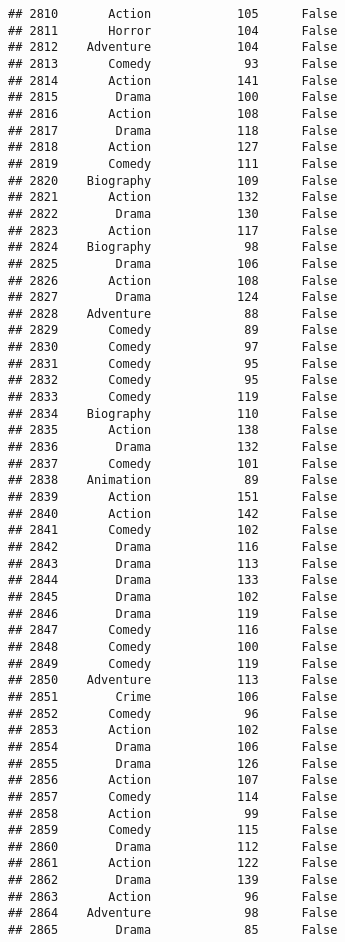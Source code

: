 \documentclass[
]{article}
\begin{document}
\begin{verbatim}
## 2810       Action            105      False
## 2811       Horror            104      False
## 2812    Adventure            104      False
## 2813       Comedy             93      False
## 2814       Action            141      False
## 2815        Drama            100      False
## 2816       Action            108      False
## 2817        Drama            118      False
## 2818       Action            127      False
## 2819       Comedy            111      False
## 2820    Biography            109      False
## 2821       Action            132      False
## 2822        Drama            130      False
## 2823       Action            117      False
## 2824    Biography             98      False
## 2825        Drama            106      False
## 2826       Action            108      False
## 2827        Drama            124      False
## 2828    Adventure             88      False
## 2829       Comedy             89      False
## 2830       Comedy             97      False
## 2831       Comedy             95      False
## 2832       Comedy             95      False
## 2833       Comedy            119      False
## 2834    Biography            110      False
## 2835       Action            138      False
## 2836        Drama            132      False
## 2837       Comedy            101      False
## 2838    Animation             89      False
## 2839       Action            151      False
## 2840       Action            142      False
## 2841       Comedy            102      False
## 2842        Drama            116      False
## 2843        Drama            113      False
## 2844        Drama            133      False
## 2845        Drama            102      False
## 2846        Drama            119      False
## 2847       Comedy            116      False
## 2848       Comedy            100      False
## 2849       Comedy            119      False
## 2850    Adventure            113      False
## 2851        Crime            106      False
## 2852       Comedy             96      False
## 2853       Action            102      False
## 2854        Drama            106      False
## 2855        Drama            126      False
## 2856       Action            107      False
## 2857       Comedy            114      False
## 2858       Action             99      False
## 2859       Comedy            115      False
## 2860        Drama            112      False
## 2861       Action            122      False
## 2862        Drama            139      False
## 2863       Action             96      False
## 2864    Adventure             98      False
## 2865        Drama             85      False

\end{verbatim}
\end{document}
